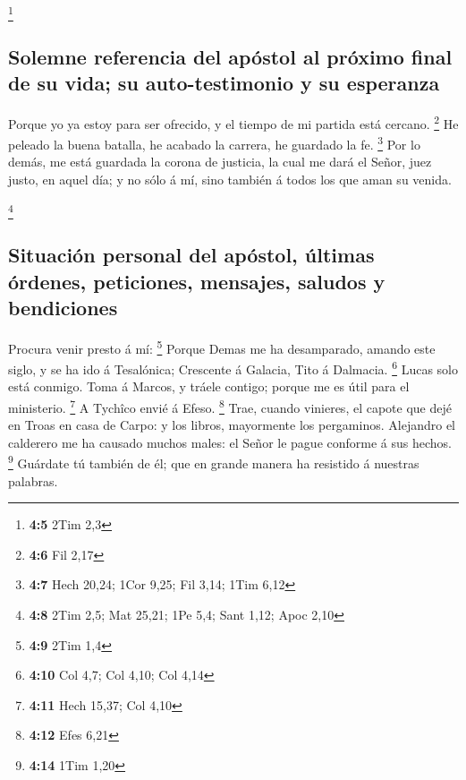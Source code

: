 \footnote{\textbf{4:5} 2Tim 2,3}

\hypertarget{solemne-referencia-del-apuxf3stol-al-pruxf3ximo-final-de-su-vida-su-auto-testimonio-y-su-esperanza}{%
\subsection{Solemne referencia del apóstol al próximo final de su vida;
su auto-testimonio y su
esperanza}\label{solemne-referencia-del-apuxf3stol-al-pruxf3ximo-final-de-su-vida-su-auto-testimonio-y-su-esperanza}}

 Porque yo ya estoy para ser ofrecido, y el tiempo de mi
partida está cercano. \footnote{\textbf{4:6} Fil 2,17}  He
peleado la buena batalla, he acabado la carrera, he guardado la fe.
\footnote{\textbf{4:7} Hech 20,24; 1Cor 9,25; Fil 3,14; 1Tim 6,12}
 Por lo demás, me está guardada la corona de justicia, la
cual me dará el Señor, juez justo, en aquel día; y no sólo á mí, sino
también á todos los que aman su venida.

\footnote{\textbf{4:8} 2Tim 2,5; Mat 25,21; 1Pe 5,4; Sant 1,12; Apoc
  2,10}

\hypertarget{situaciuxf3n-personal-del-apuxf3stol-uxfaltimas-uxf3rdenes-peticiones-mensajes-saludos-y-bendiciones}{%
\subsection{Situación personal del apóstol, últimas órdenes, peticiones,
mensajes, saludos y
bendiciones}\label{situaciuxf3n-personal-del-apuxf3stol-uxfaltimas-uxf3rdenes-peticiones-mensajes-saludos-y-bendiciones}}

 Procura venir presto á mí: \footnote{\textbf{4:9} 2Tim 1,4}
 Porque Demas me ha desamparado, amando este siglo, y se ha
ido á Tesalónica; Crescente á Galacia, Tito á Dalmacia. \footnote{\textbf{4:10}
  Col 4,7; Col 4,10; Col 4,14}  Lucas solo está conmigo.
Toma á Marcos, y tráele contigo; porque me es útil para el ministerio.
\footnote{\textbf{4:11} Hech 15,37; Col 4,10}  A Tychîco
envié á Efeso. \footnote{\textbf{4:12} Efes 6,21}  Trae,
cuando vinieres, el capote que dejé en Troas en casa de Carpo: y los
libros, mayormente los pergaminos.  Alejandro el calderero
me ha causado muchos males: el Señor le pague conforme á sus hechos.
\footnote{\textbf{4:14} 1Tim 1,20}  Guárdate tú también de
él; que en grande manera ha resistido á nuestras palabras.

